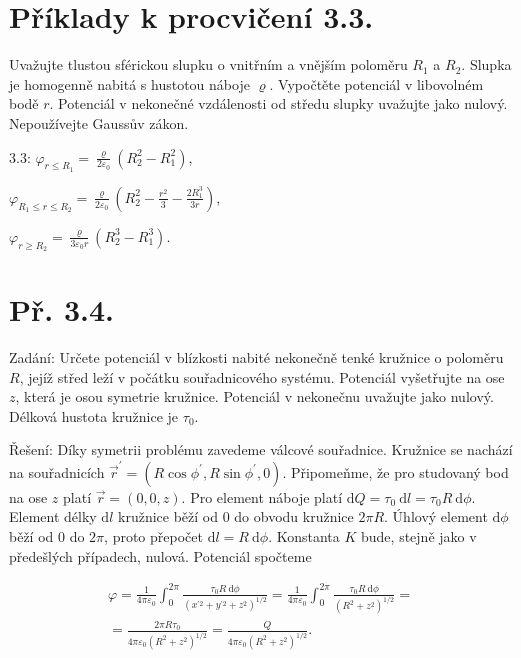 \documentclass[czech,11pt,a4paper]{article}
\begin{document}
\section{Příklady k procvičení 3.3.}

Uvažujte tlustou sférickou slupku o vnitřním a vnějším poloměru $R_{1}$ a $R_{2}$. Slupka je homogenně nabitá s hustotou náboje $\varrho$. Vypočtěte potenciál v libovolném bodě $r$. Potenciál v nekonečné vzdálenosti od středu slupky uvažujte jako nulový. Nepoužívejte Gaussův zákon.

3.3: $\varphi_{r \leq R_{1}}=\frac{\varrho}{2 \varepsilon_{0}}\left(R_{2}^{2}-R_{1}^{2}\right)$,

$\varphi_{R_{1} \leq r \leq R_{2}}=\frac{\varrho}{2 \varepsilon_{0}}\left(R_{2}^{2}-\frac{r^{2}}{3}-\frac{2 R_{1}^{3}}{3 r}\right)$,

$\varphi_{r \geq R_{2}}=\frac{\varrho}{3 \varepsilon_{0} r}\left(R_{2}^{3}-R_{1}^{3}\right)$.


\section{Př. 3.4.}

Zadání: Určete potenciál v blízkosti nabité nekonečně tenké kružnice o poloměru $R$, jejíž střed leží v počátku souřadnicového systému. Potenciál vyšetřujte na ose $z$, která je osou symetrie kružnice. Potenciál v nekonečnu uvažujte jako nulový. Délková hustota kružnice je $\tau_{0}$.

Řešení: Díky symetrii problému zavedeme válcové souřadnice. Kružnice se nachází na souřadnicích $\vec{r}^{\prime}=\left(R \cos \phi^{\prime}, R \sin \phi^{\prime}, 0\right)$. Připomeňme, že pro studovaný bod na ose $z$ platí $\vec{r}=(0,0, z)$. Pro element náboje platí $\mathrm{d} Q=\tau_{0} \mathrm{~d} l=\tau_{0} R \mathrm{~d} \phi$. Element délky $\mathrm{d} l$ kružnice běží od 0 do obvodu kružnice $2 \pi R$. Úhlový element $\mathrm{d} \phi$ běží od 0 do $2 \pi$, proto přepočet $\mathrm{d} l=R \mathrm{~d} \phi$. Konstanta $K$ bude, stejně jako v předešlých případech, nulová. Potenciál spočteme

$$
\begin{gathered}
	\varphi=\frac{1}{4 \pi \varepsilon_{0}} \int_{0}^{2 \pi} \frac{\tau_{0} R \mathrm{~d} \phi}{\left(x^{\prime 2}+y^{\prime 2}+z^{2}\right)^{1 / 2}}=\frac{1}{4 \pi \varepsilon_{0}} \int_{0}^{2 \pi} \frac{\tau_{0} R \mathrm{~d} \phi}{\left(R^{2}+z^{2}\right)^{1 / 2}}= \\
	=\frac{2 \pi R \tau_{0}}{4 \pi \varepsilon_{0}\left(R^{2}+z^{2}\right)^{1 / 2}}=\frac{Q}{4 \pi \varepsilon_{0}\left(R^{2}+z^{2}\right)^{1 / 2}} .
\end{gathered}
$$
\end{document}
